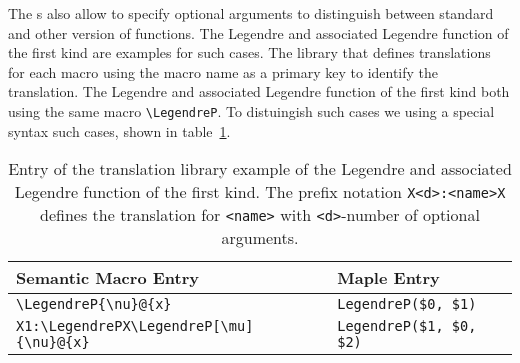 

The \Macro s also allow to specify optional arguments to distinguish between standard and other version of functions. The Legendre and associated Legendre function of the first kind are examples for such cases. The library that defines translations for each macro using the macro name as a primary key to identify the translation. The Legendre and associated Legendre function of the first kind both using the same macro \verb|\LegendreP|. To distuingish such cases we using a special syntax such cases, shown in table~\ref{tab:legendreP-lex}.

\begin{table}[ht]
	\centering
	\begin{tabular}{ll}
		\hline
		Semantic Macro Entry & Maple Entry \\
		\hline
		\verb|\LegendreP{\nu}@{x}| & \verb|LegendreP($0, $1)| \\
		\verb|X1:\LegendrePX\LegendreP[\mu]{\nu}@{x}| & \verb|LegendreP($1, $0, $2)|\\
		\hline
	\end{tabular}
	\caption{Entry of the translation library example of the Legendre and associated Legendre function of the first kind. The prefix notation \texttt{X<d>:<name>X} defines the translation for \texttt{<name>} with \texttt{<d>}-number of optional arguments.}
	\label{tab:legendreP-lex}
\end{table}

